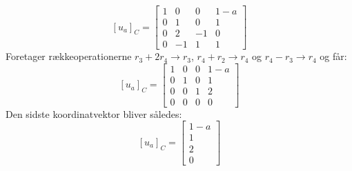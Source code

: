 \documentclass{article}
\begin{document}
$$
\left[u_a\right]_C=\left[\begin{array}{ccc|c}
1 & 0 & 0 & 1-a \\
0 & 1 & 0 & 1 \\
0 & 2 & -1 & 0 \\
0 & -1 & 1 & 1
\end{array}\right]
$$
Foretager rækkeoperationerne $r_3+2 r_4 \rightarrow r_3$, $r_4+r_2 \rightarrow r_4$ og $r_4-r_3 \rightarrow r_4$ og får:
$$
\left[u_a\right]_C=\left[\begin{array}{ccc|c}
1 & 0 & 0 & 1-a \\
0 & 1 & 0 & 1 \\
0 & 0 & 1 & 2 \\
0 & 0 & 0 & 0
\end{array}\right]
$$
Den sidste koordinatvektor bliver således:
$$
\left[u_a\right]_C=\left[\begin{array}{c}
1-a \\
1 \\
2 \\
0
\end{array}\right]
$$
\end{document}
